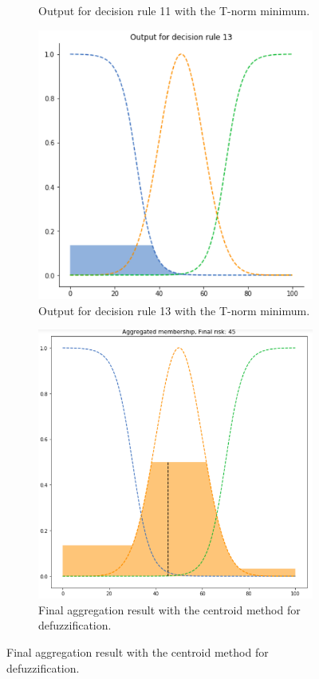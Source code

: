\documentclass[conference]{IEEEtran}
\begin{document}
\begin{figure}[ht]
\begin{subfigure}{.5\textwidth}
  \caption{Output for decision rule 11 with the T-norm minimum.}
  \label{fig:2min2}
\end{subfigure}
\begin{subfigure}{.5\textwidth}
  \centering
  \includegraphics[width=.8\linewidth]{figures/second/min3.png}  
  \caption{Output for decision rule 13 with the T-norm minimum.}
  \label{fig:2min3}
\end{subfigure}
\begin{subfigure}{.5\textwidth}
  \centering
  \includegraphics[width=.8\linewidth]{figures/second/min-centroid.png}  
  \caption{Final aggregation result with the centroid method for defuzzification.}

\end{subfigure}
\end{figure}
\end{document}
